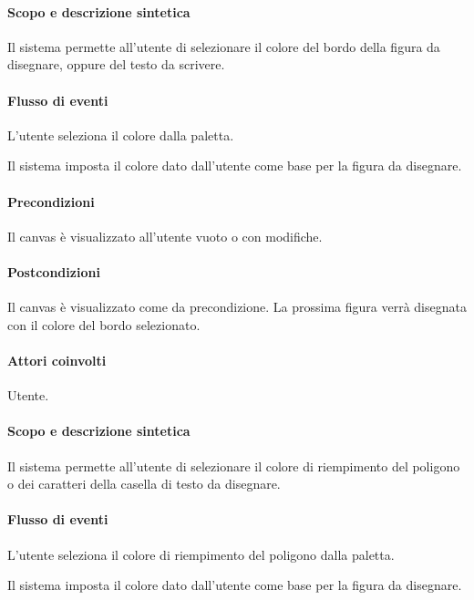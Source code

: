 \paragraph{Scopo e descrizione sintetica} 
Il sistema permette all'utente di selezionare il colore del bordo della figura da disegnare, oppure del testo da scrivere.
\paragraph{Flusso di eventi}
\begin{elenconumerato}[\textbf{}]{\subsubsecindent}
\item L'utente seleziona il colore dalla paletta.
\item Il sistema imposta il colore dato dall'utente come base per la figura da disegnare.
\end{elenconumerato}
\paragraph{Precondizioni} Il canvas \`e visualizzato all'utente vuoto o con modifiche.
\paragraph{Postcondizioni} Il canvas \`e visualizzato come da precondizione. La prossima figura verr\` a disegnata con il colore del bordo selezionato.

\paragraph{Attori coinvolti} Utente.
\paragraph{Scopo e descrizione sintetica} 
Il sistema permette all'utente di selezionare il colore di riempimento del poligono o dei caratteri della casella di testo da disegnare.
\paragraph{Flusso di eventi}
\begin{elenconumerato}[\textbf{}]{\subsubsecindent}
\item L'utente seleziona il colore di riempimento del poligono dalla paletta.
\item Il sistema imposta il colore dato dall'utente come base per la figura da disegnare.
\end{elenconumerato}
